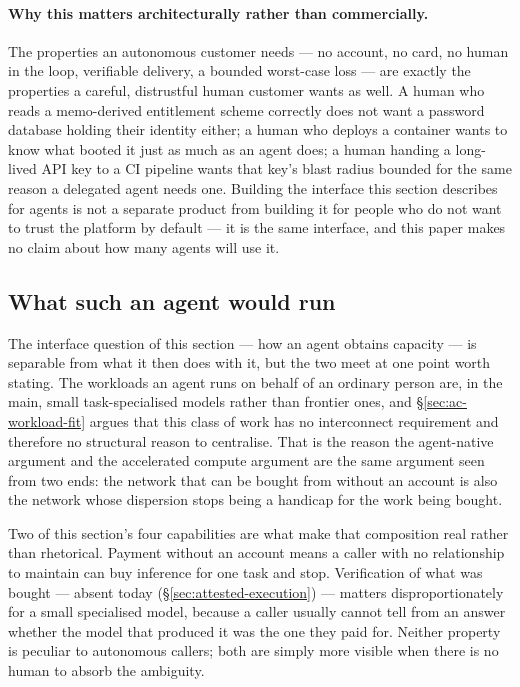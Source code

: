 \paragraph{Why this matters architecturally rather than commercially.} The properties an
autonomous customer needs --- no account, no card, no human in the loop, verifiable delivery, a
bounded worst-case loss --- are exactly the properties a careful, distrustful human customer
wants as well. A human who reads a memo-derived entitlement scheme correctly does not want a
password database holding their identity either; a human who deploys a container wants to know
what booted it just as much as an agent does; a human handing a long-lived API key to a CI
pipeline wants that key's blast radius bounded for the same reason a delegated agent needs one.
Building the interface this section describes for agents is not a separate product from building
it for people who do not want to trust the platform by default --- it is the same interface,
and this paper makes no claim about how many agents will use it.

\subsection{What such an agent would run}
\label{sec:agent-native-workload}

The interface question of this section --- how an agent obtains capacity --- is separable from what it
then does with it, but the two meet at one point worth stating. The workloads an agent runs on behalf of
an ordinary person are, in the main, small task-specialised models rather than frontier ones, and
\S\ref{sec:ac-workload-fit} argues that this class of work has no interconnect requirement and therefore
no structural reason to centralise. That is the reason the agent-native argument and the accelerated
compute argument are the same argument seen from two ends: the network that can be bought from without
an account is also the network whose dispersion stops being a handicap for the work being bought.

Two of this section's four capabilities are what make that composition real rather than rhetorical.
Payment without an account means a caller with no relationship to maintain can buy inference for one
task and stop. Verification of what was bought --- absent today (\S\ref{sec:attested-execution}) ---
matters disproportionately for a small specialised model, because a caller usually cannot tell from an
answer whether the model that produced it was the one they paid for. Neither property is peculiar to
autonomous callers; both are simply more visible when there is no human to absorb the ambiguity.

\FloatBarrier
